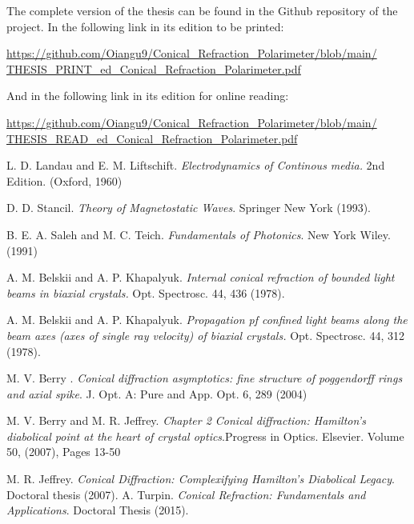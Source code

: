 \documentclass[11pt, a4paper, twoside]{article} %
\begin{document}
\newpage
\begin{thebibliography}{1}
{\small 

The complete version of the thesis can be found in the Github repository of the project. In the following link in its edition to be printed:

\href{https://github.com/Oiangu9/Conical_Refraction_Polarimeter/blob/main/THESIS_PRINT_ed_Conical_Refraction_Polarimeter.pdf}{https://github.com/Oiangu9/Conical\_Refraction\_Polarimeter/blob/main/\\ THESIS\_PRINT\_ed\_Conical\_Refraction\_Polarimeter.pdf}

And in the following link in its edition for online reading:

\href{https://github.com/Oiangu9/Conical_Refraction_Polarimeter/blob/main/THESIS_READ_ed_Conical_Refraction_Polarimeter.pdf}{https://github.com/Oiangu9/Conical\_Refraction\_Polarimeter/blob/main/\\ THESIS\_READ\_ed\_Conical\_Refraction\_Polarimeter.pdf}

L. D. Landau and E. M. Liftschift. {\em Electrodynamics of Continous media.} 2nd Edition. (Oxford, 1960)

D. D. Stancil. {\em Theory of Magnetostatic Waves}. Springer New York (1993).

B. E. A. Saleh and M. C. Teich. {\em Fundamentals of Photonics}. New York Wiley. (1991)

A. M. Belskii and A. P. Khapalyuk. {\em Internal conical refraction of bounded light beams in biaxial crystals.} Opt. Spectrosc. 44, 436 (1978).

A. M. Belskii and A. P. Khapalyuk. {\em Propagation pf confined light beams along the beam axes (axes of single ray velocity) of biaxial crystals.} Opt. Spectrosc. 44, 312 (1978).

M. V. Berry . {\em Conical diffraction asymptotics: fine structure of poggendorff rings and axial spike}. J. Opt. A: Pure and App. Opt. 6, 289 (2004)

M. V. Berry and M. R. Jeffrey. {\em Chapter 2 Conical diffraction: Hamilton's diabolical point at the heart of crystal optics}.Progress in Optics. Elsevier. Volume 50, (2007), Pages 13-50

M. R. Jeffrey. {\em Conical Diffraction: Complexifying
Hamilton’s Diabolical Legacy}. Doctoral thesis (2007).
A. Turpin. {\em Conical Refraction: Fundamentals and Applications}. Doctoral Thesis (2015).

}
\end{thebibliography}
\end{document}
